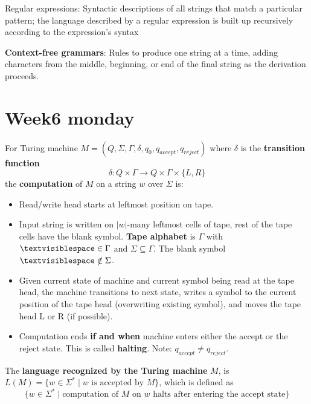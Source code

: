 \documentclass[12pt, oneside]{article}
\begin{document}
Regular expressions: Syntactic descriptions of all strings that match a particular pattern; the language 
described by a regular expression is built up recursively according to the expression's syntax

{\bf Context-free grammars}: Rules to produce one string at a time, adding characters from the middle, beginning, 
or end of the final string as the derivation proceeds.

 \vfill
\section*{Week6 monday}


For Turing machine $M= (Q, \Sigma, \Gamma, \delta, q_0, q_{accept}, q_{reject})$ 
where $\delta$ is the {\bf transition function} 
\[
  \delta: Q\times \Gamma \to Q \times \Gamma \times \{L, R\}
\]
the {\bf computation} of $M$ on a string $w$ over $\Sigma$  is:

\begin{itemize}
\setlength{\itemsep}{0pt}
\item Read/write head starts at leftmost position on tape. 
\item Input string is written on $|w|$-many leftmost cells of tape, 
rest of  the tape cells have  the blank symbol. {\bf Tape alphabet} 
is $\Gamma$ with $\textvisiblespace\in \Gamma$ and $\Sigma \subseteq \Gamma$.
The blank symbol $\textvisiblespace \notin \Sigma$.
\item Given current state of machine and current symbol being read at the tape head, 
the machine transitions to next state, writes a symbol to the current position  of the 
tape  head (overwriting existing symbol), and moves the tape head L or R (if possible). 
\item Computation ends {\bf if and when} machine enters either the accept or the reject state.
This is called {\bf halting}.
Note: $q_{accept} \neq q_{reject}$.
\end{itemize}

The {\bf language recognized by the  Turing machine} $M$,  is  $L(M) = \{ w \in \Sigma^* \mid w \textrm{ is accepted by } M\}$,
which is defined as
\[
  \{ w \in \Sigma^* \mid \textrm{computation of $M$ on $w$ halts after entering the accept state}\}
\]
  
\end{document}
